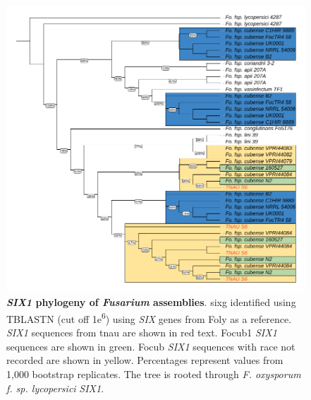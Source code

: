 \begin{figure}[htp!]
  \centering
  \includegraphics[]{Figures/FusSIX1.phylo.pdf}
  \caption[\textit{SIX1} phylogeny of \textit{Fusarium} assemblies]{\textbf{\textit{SIX1} phylogeny of \textit{Fusarium} assemblies}. \acl{sixg} identified using TBLASTN (cut off 1\-e\textsuperscript{6}) using \textit{SIX} genes from \acl{Foly} as a reference. \textit{SIX1} sequences from \ac{tnau} are shown in red text. \Acl{Focub1} \textit{SIX1} sequences are shown in green. \acl{Focub} \textit{SIX1} sequences with race not recorded are shown in yellow. Percentages represent values from 1,000 bootstrap replicates. The tree is rooted through \textit{F. oxysporum f. sp. lycopersici} \textit{SIX1}.}
  \label{fig:FusSIX1}
\end{figure}

